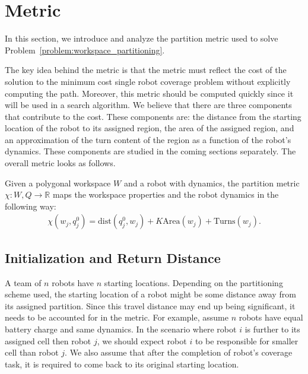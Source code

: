 \documentclass[../main.tex]{subfiles}
\begin{document}
\section{Metric}
\label{sec:metric}

In this section, we introduce and analyze the partition metric used to solve Problem~\ref{problem:workspace_partitioning}.

The key idea behind the metric is that the metric must reflect the cost of the solution to the minimum cost single robot coverage problem without explicitly computing the path. Moreover, this metric should be computed quickly since it will be used in a search algorithm. We believe that there are three components that contribute to the cost. These components are: the distance from the starting location of the robot to its assigned region, the area of the assigned region, and an approximation of the turn content of the region as a function of the robot's dynamics. These components are studied in the coming sections separately. The overall metric looks as follows.

\begin{definition}
Given a polygonal workspace $W$ and a robot with dynamics, the partition metric $\chi:W,Q\to\mathbb{R}$ maps the workspace properties and the robot dynamics in the following way:
	\begin{equation}
		\begin{aligned}
			\chi(w_j,q_j^0)=\text{dist}(q^0_j,w_j)+K\text{Area}(w_j)+\text{Turns}(w_j).
		\end{aligned}
	\end{equation}
\end{definition}


\subsection{Initialization and Return Distance}

A team of $n$ robots have $n$ starting locations. Depending on the partitioning scheme used, the starting location of a robot might be some distance away from its assigned partition. Since this travel distance may end up being significant, it needs to be accounted for in the metric. For example, assume $n$ robots have equal battery charge and same dynamics. In the scenario where robot $i$ is further to its assigned cell then robot $j$, we should expect robot $i$ to be responsible for smaller cell than robot $j$. We also assume that after the completion of robot's coverage task, it is required to come back to its original starting location.
\end{document}
